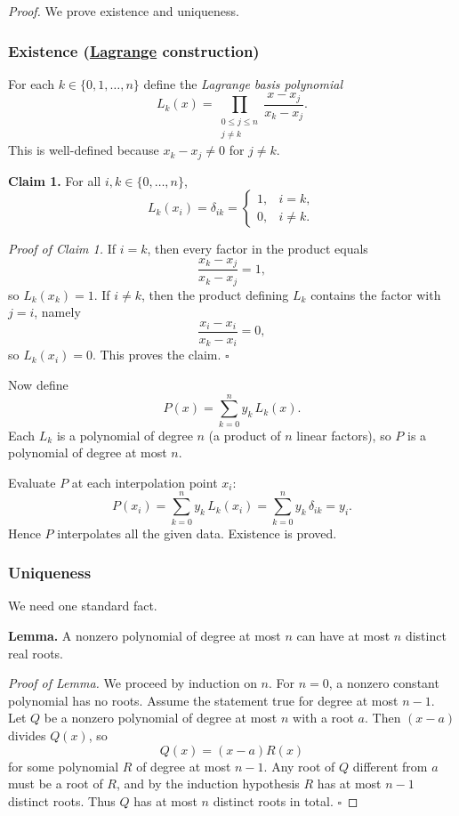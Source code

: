 \begin{proof}
We prove existence and uniqueness.

\subsubsection*{Existence (\href{https://en.wikipedia.org/wiki/Joseph-Louis_Lagrange}{Lagrange} construction)}
For each $k\in\{0,1,\dots,n\}$ define the \emph{Lagrange basis polynomial}
\[
L_k(x)
=
\prod_{\substack{0\le j\le n \\ j\neq k}}
\frac{x-x_j}{x_k-x_j}.
\]
This is well-defined because $x_k-x_j\neq 0$ for $j\neq k$.

\medskip
\noindent
\textbf{Claim 1.} For all $i,k\in\{0,\dots,n\}$,
\[
L_k(x_i)=\delta_{ik}=
\begin{cases}
1,& i=k,\\
0,& i\neq k.
\end{cases}
\]

\noindent
\emph{Proof of Claim 1.}
If $i=k$, then every factor in the product equals
\[
\frac{x_k-x_j}{x_k-x_j}=1,
\]
so $L_k(x_k)=1$.
If $i\neq k$, then the product defining $L_k$ contains the factor with
$j=i$, namely
\[
\frac{x_i-x_i}{x_k-x_i}=0,
\]
so $L_k(x_i)=0$.  This proves the claim. \hfill $\square$

\medskip
Now define
\[
P(x)=\sum_{k=0}^n y_k\,L_k(x).
\]
Each $L_k$ is a polynomial of degree $n$ (a product of $n$ linear factors),
so $P$ is a polynomial of degree at most $n$.

Evaluate $P$ at each interpolation point $x_i$:
\[
P(x_i)
=
\sum_{k=0}^n y_k\,L_k(x_i)
=
\sum_{k=0}^n y_k\,\delta_{ik}
=
y_i.
\]
Hence $P$ interpolates all the given data.  Existence is proved.

\subsubsection*{Uniqueness}
We need one standard fact.

\medskip
\noindent
\textbf{Lemma.} A nonzero polynomial of degree at most $n$ can have at most
$n$ distinct real roots.

\noindent
\emph{Proof of Lemma.}
We proceed by induction on $n$.
For $n=0$, a nonzero constant polynomial has no roots.  
Assume the statement true for degree at most $n-1$.
Let $Q$ be a nonzero polynomial of degree at most $n$ with a root $a$.
Then $(x-a)$ divides $Q(x)$, so
\[
Q(x)=(x-a)R(x)
\]
for some polynomial $R$ of degree at most $n-1$.
Any root of $Q$ different from $a$ must be a root of $R$, and by the
induction hypothesis $R$ has at most $n-1$ distinct roots.  
Thus $Q$ has at most $n$ distinct roots in total. \hfill $\square$


\end{proof}
